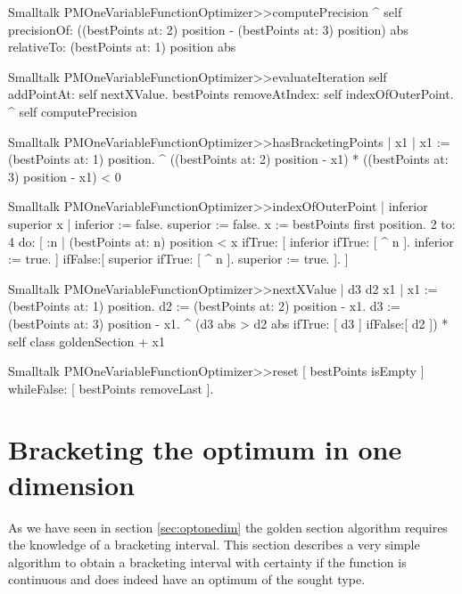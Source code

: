 \begin{displaycode}{Smalltalk}
PMOneVariableFunctionOptimizer>>computePrecision
    ^ self precisionOf: ((bestPoints at: 2) position - (bestPoints 
                                                  at: 3) position) abs
           relativeTo: (bestPoints at: 1) position abs
\end{displaycode}

\begin{displaycode}{Smalltalk}
PMOneVariableFunctionOptimizer>>evaluateIteration
    self addPointAt: self nextXValue.
    bestPoints removeAtIndex: self indexOfOuterPoint.
    ^ self computePrecision
\end{displaycode}

\begin{displaycode}{Smalltalk}
PMOneVariableFunctionOptimizer>>hasBracketingPoints
    | x1 |
    x1 := (bestPoints at: 1) position.
    ^ ((bestPoints at: 2) position - x1) * ((bestPoints at: 3) 
                                                    position - x1) < 0

\begin{displaycode}{Smalltalk}
PMOneVariableFunctionOptimizer>>indexOfOuterPoint
    | inferior superior x |
    inferior := false.
    superior := false.
    x := bestPoints first position.
    2 to: 4 do:
        [ :n |
          (bestPoints at: n) position < x
                ifTrue: [ inferior
                            ifTrue: [ ^ n ].
                          inferior := true.
                        ]
                ifFalse:[ superior
                            ifTrue: [ ^ n ].
                          superior := true.
                        ].
        ]
\end{displaycode}

\begin{displaycode}{Smalltalk}
PMOneVariableFunctionOptimizer>>nextXValue
    | d3 d2 x1 |
    x1 := (bestPoints at: 1) position.
    d2 := (bestPoints at: 2) position - x1.
    d3 := (bestPoints at: 3) position - x1.
    ^ (d3 abs > d2 abs ifTrue: [ d3 ]
                       ifFalse:[ d2 ]) * self class goldenSection + x1
\end{displaycode}

\begin{displaycode}{Smalltalk}
PMOneVariableFunctionOptimizer>>reset
    [ bestPoints isEmpty ] whileFalse: [ bestPoints removeLast ].
\end{displaycode}

\section{Bracketing the optimum in one dimension}
\label{sec:bracket} As we have seen in section \ref{sec:optonedim}
the golden section algorithm requires the knowledge of a
bracketing interval. This section describes a very simple
algorithm to obtain a bracketing interval with certainty if the
function is continuous and does indeed have an optimum of the
sought type.


\end{displaycode}
